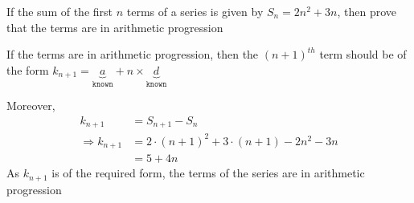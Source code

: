 

\question[4] If the sum of the first $n$ terms of a series is given by 
$S_n = 2n^2+3n$, then prove that the terms are in arithmetic progression


\ifprintanswers
\fi 

\begin{solution}[\halfpage]
  If the terms are in arithmetic progression, then the $(n+1)^{th}$ term should be 
  of the form $k_{n+1} = \underbrace{a}_{\texttt{known}} + n\times\underbrace{d}_{\texttt{known}}$
  
  Moreover,
  \begin{align}
     k_{n+1} &= S_{n+1} - S_n \\
        \Rightarrow k_{n+1} &= 2\cdot(n+1)^2 + 3\cdot(n+1) - 2n^2 - 3n \\
        &= 5 + 4n
  \end{align}
  As $k_{n+1}$ is of the required form, the terms of the series are in arithmetic progression
  
\end{solution}
